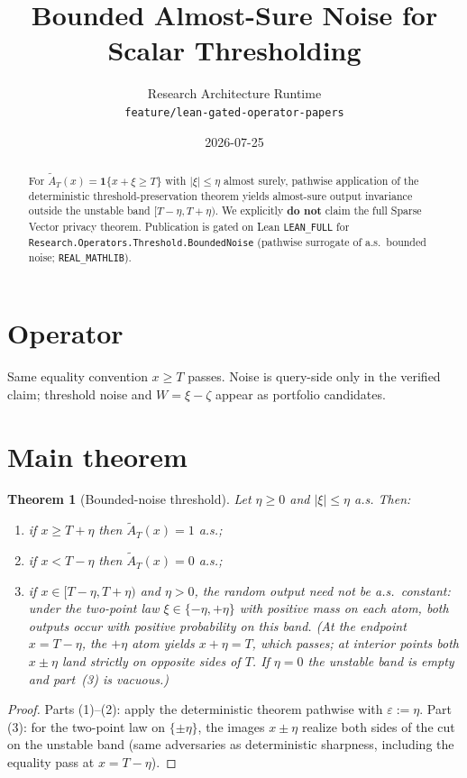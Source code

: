 \documentclass[11pt]{article}
\title{Bounded Almost-Sure Noise for Scalar Thresholding}
\author{Research Architecture Runtime \\ \texttt{feature/lean-gated-operator-papers}}
\date{2026-07-25}
\newtheorem{theorem}{Theorem}
\begin{document}
\maketitle

\begin{abstract}
For \(\widetilde A_T(x)=\mathbf{1}\{x+\xi\ge T\}\) with
\(\lvert\xi\rvert\le\eta\) almost surely, pathwise application of the
deterministic threshold-preservation theorem yields almost-sure output
invariance outside the unstable band \([T-\eta,T+\eta)\).
We explicitly \textbf{do not} claim the full Sparse Vector privacy theorem.
Publication is gated on Lean \texttt{LEAN\_FULL} for
\texttt{Research.Operators.Threshold.BoundedNoise}
(pathwise surrogate of a.s.\ bounded noise;
\texttt{REAL\_MATHLIB}).
\end{abstract}

\section{Operator}
Same equality convention \(x\ge T\) passes.
Noise is query-side only in the verified claim; threshold noise and
\(W=\xi-\zeta\) appear as portfolio candidates.

\section{Main theorem}
\begin{theorem}[Bounded-noise threshold]\label{thm:noisy}
Let \(\eta\ge 0\) and \(\lvert\xi\rvert\le\eta\) a.s. Then:
\begin{enumerate}
\item if \(x\ge T+\eta\) then \(\widetilde A_T(x)=1\) a.s.;
\item if \(x<T-\eta\) then \(\widetilde A_T(x)=0\) a.s.;
\item if \(x\in[T-\eta,T+\eta)\) and \(\eta>0\), the random output need not be a.s.\ constant:
under the two-point law \(\xi\in\{-\eta,+\eta\}\) with positive mass on each atom,
both outputs occur with positive probability on this band.
(At the endpoint \(x=T-\eta\), the \(+\eta\) atom yields \(x+\eta=T\), which passes;
at interior points both \(x\pm\eta\) land strictly on opposite sides of \(T\).
If \(\eta=0\) the unstable band is empty and part~(3) is vacuous.)
\end{enumerate}
\end{theorem}

\begin{proof}
Parts (1)--(2): apply the deterministic theorem pathwise with \(\varepsilon:=\eta\).
Part (3): for the two-point law on \(\{\pm\eta\}\), the images \(x\pm\eta\) realize
both sides of the cut on the unstable band (same adversaries as deterministic
sharpness, including the equality pass at \(x=T-\eta\)).
\end{proof}
\end{document}
